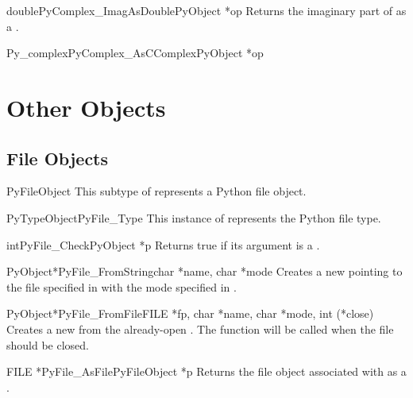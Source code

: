 \documentclass{manual}
\begin{document}
\begin{cfuncdesc}{double}{PyComplex_ImagAsDouble}{PyObject *op}
Returns the imaginary part of  as a \C{} .
\end{cfuncdesc}

\begin{cfuncdesc}{Py_complex}{PyComplex_AsCComplex}{PyObject *op}
\end{cfuncdesc}



\section{Other Objects \label{otherObjects}}

\subsection{File Objects \label{fileObjects}}

\begin{ctypedesc}{PyFileObject}
This subtype of  represents a Python file object.
\end{ctypedesc}

\begin{cvardesc}{PyTypeObject}{PyFile_Type}
This instance of  represents the Python file type.
\end{cvardesc}

\begin{cfuncdesc}{int}{PyFile_Check}{PyObject *p}
Returns true if its argument is a .
\end{cfuncdesc}

\begin{cfuncdesc}{PyObject*}{PyFile_FromString}{char *name, char *mode}
Creates a new  pointing to the file
specified in  with the mode specified in .
\end{cfuncdesc}

\begin{cfuncdesc}{PyObject*}{PyFile_FromFile}{FILE *fp,
              char *name, char *mode, int (*close)}
Creates a new  from the already-open .
The function  will be called when the file should be
closed.
\end{cfuncdesc}

\begin{cfuncdesc}{FILE *}{PyFile_AsFile}{PyFileObject *p}
Returns the file object associated with  as a .
\end{cfuncdesc}
\end{document}

